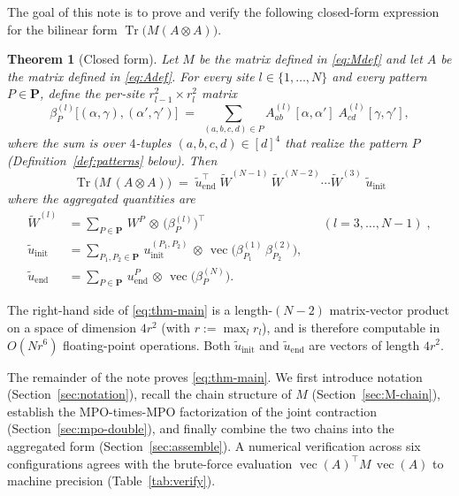 \documentclass[11pt]{article}
\newtheorem{theorem}{Theorem}
\DeclareMathOperator{\Tr}{Tr}
\DeclareMathOperator{\vecop}{vec}
\newcommand{\bP}{\boldsymbol{P}}
\newcommand{\Wtilde}{\widetilde{W}}
\newcommand{\utilde}{\widetilde{u}}
\begin{document}
The goal of this note is to prove and verify the following closed-form
expression for the bilinear form $\Tr\bigl(M(A\otimes A)\bigr)$.

\begin{theorem}[Closed form]\label{thm:main}
Let $M$ be the matrix defined in \eqref{eq:Mdef} and let $A$ be the matrix
defined in \eqref{eq:Adef}. For every site $l\in\{1,\dots,N\}$ and every
pattern $P\in\bP$, define the per-site $r_{l-1}^2 \times r_l^2$ matrix
\begin{equation}\label{eq:beta-def}
\beta_P^{(l)}\bigl[(\alpha,\gamma),(\alpha',\gamma')\bigr]
\;=\;
\sum_{(a,b,c,d)\in P}
A^{(l)}_{ab}[\alpha,\alpha']\;A^{(l)}_{cd}[\gamma,\gamma'],
\end{equation}
where the sum is over $4$-tuples $(a,b,c,d)\in[d]^4$ that realize the
pattern $P$ (Definition~\ref{def:patterns} below). Then
\begin{equation}\label{eq:thm-main}
\boxed{\;
\Tr\bigl(M\,(A\otimes A)\bigr) \;=\;
\utilde_{\mathrm{end}}^{\!\top}
\;\Wtilde^{(N-1)}\,\Wtilde^{(N-2)}\cdots\Wtilde^{(3)}\;
\utilde_{\mathrm{init}}\;}
\end{equation}
where the aggregated quantities are
\begin{align}
\Wtilde^{(l)}
&= \sum_{P\in\bP}\, W^P \,\otimes\, \bigl(\beta_P^{(l)}\bigr)^{\!\top}
&& (l = 3,\dots,N-1)\;,\label{eq:Wtilde}\\[2pt]
\utilde_{\mathrm{init}}
&= \sum_{P_1,P_2\in\bP}\,
u_{\mathrm{init}}^{(P_1,P_2)}\,\otimes\,
\vecop\!\bigl(\beta_{P_1}^{(1)}\,\beta_{P_2}^{(2)}\bigr),
\label{eq:uinit}\\[2pt]
\utilde_{\mathrm{end}}
&= \sum_{P\in\bP}\,
u_{\mathrm{end}}^{P}\,\otimes\,
\vecop\!\bigl(\beta_P^{(N)}\bigr).
\label{eq:uend}
\end{align}
\end{theorem}

The right-hand side of \eqref{eq:thm-main} is a length-$(N-2)$ matrix-vector
product on a space of dimension $4 r^2$ (with $r := \max_l r_l$), and is
therefore computable in $O(N r^6)$ floating-point operations. Both
$\utilde_{\mathrm{init}}$ and $\utilde_{\mathrm{end}}$ are vectors of length
$4 r^2$.

The remainder of the note proves \eqref{eq:thm-main}. We first introduce
notation (Section~\ref{sec:notation}), recall the chain structure of $M$
(Section~\ref{sec:M-chain}), establish the MPO-times-MPO factorization
of the joint contraction (Section~\ref{sec:mpo-double}), and finally
combine the two chains into the aggregated form
(Section~\ref{sec:assemble}). A numerical verification across six
configurations agrees with the brute-force evaluation
$\vecop(A)^\top M \,\vecop(A)$ to machine precision (Table~\ref{tab:verify}).
\end{document}
